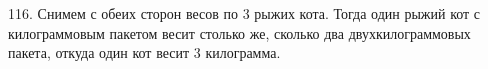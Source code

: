 116. Снимем с обеих сторон весов по 3 рыжих кота. Тогда один рыжий кот с килограммовым пакетом весит столько же, сколько два двухкилограммовых пакета, откуда один кот весит 3 килограмма.\\
